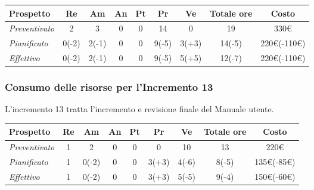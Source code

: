 {{{{{{{{{{{{{	\begin{center}
		\renewcommand{\arraystretch}{1.4}
		\begin{tabularx}{\textwidth}{|X|c|c|c|c|c|c|c|c|}
			\hline
			\rowcolor{airforceblue}
			\textbf{Prospetto} & \textbf{Re} & \textbf{Am} & \textbf{An} & \textbf{Pt} & \textbf{Pr} & \textbf{Ve} & \textbf{Totale ore} & \textbf{Costo} \\
			\hline
			\textit{Preventivato} & 2 & 3 & 0 & 0 & 14 & 0 & 19 & 330\euro \\
			\hline
			\textit{Pianificato} & 0(-2) & 2(-1) & 0 & 0 & 9(-5) & 3(+3) & 14(-5) & 220\euro(-110\euro) \\
			\hline
			\textit{Effettivo} & 0(-2) & 2(-1) & 0 & 0 & 9(-5) & 5(+5) & 12(-7) & 220\euro(-110\euro) \\
			\hline
		\end{tabularx}
	\end{center}

\subsubsection{Consumo delle risorse per l'Incremento 13}
L'incremento 13 tratta l'incremento e revisione finale del Manuale utente.
\quad
\def\tabularxcolumn#1{m{#1}}
{

	\begin{center}
		\renewcommand{\arraystretch}{1.4}
		\begin{tabularx}{\textwidth}{|X|c|c|c|c|c|c|c|c|}
			\hline
			\rowcolor{airforceblue}
			\textbf{Prospetto} & \textbf{Re} & \textbf{Am} & \textbf{An} & \textbf{Pt} & \textbf{Pr} & \textbf{Ve} & \textbf{Totale ore} & \textbf{Costo} \\
			\hline
			\textit{Preventivato} & 1 & 2 & 0 & 0 & 0 & 10 & 13 & 220\euro\\
			\hline
			\textit{Pianificato} & 1 & 0(-2) & 0 & 0 & 3(+3) & 4(-6) & 8(-5) & 135\euro(-85\euro) \\
			\hline
			\textit{Effettivo} & 1 & 0(-2) & 0 & 0 & 3(+3) & 5(-5) & 9(-4) & 150\euro(-60\euro) \\
			\hline
		\end{tabularx}
	\end{center}

}}}}}}}}}}}}}}
